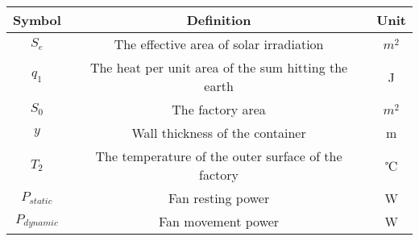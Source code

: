 \begin{table}[h]
    \begin{center}
        \begin{tabular}{ccc}
        \toprule[1.5pt]
			Symbol&Definition&Unit\\
			\midrule[1pt]
            \(S_e\)&The effective area of solar irradiation&$m^2$\\
            \(q_1\)&The heat per unit area of the sum hitting the earth&J\\
            \(S_0\)&The factory area&$m^2$\\
            \(y\)&Wall thickness of the container&m\\
            \(T_2\)&The temperature of the outer surface of the factory&℃\\
            \(P_{static}\)&Fan resting power&W\\
            \(P_{dynamic}\)&Fan movement power&W\\
            \bottomrule[1.5pt]
    \end{tabular}
    \end{center}
\end{table}
